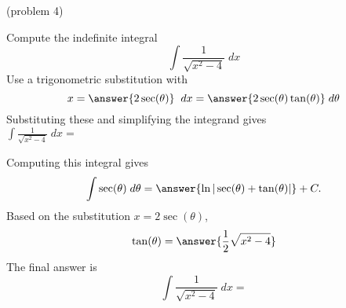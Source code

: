 \documentclass[handout]{ximera}
\begin{document}
\begin{problem}(problem 4)

Compute the indefinite integral 
\[
\int   \frac{1}{\sqrt{x^2 - 4}} \; dx
\]
Use a trigonometric substitution with\\
\[
x = \answer{2\sec(\theta)} \;\; dx = \answer{2\sec(\theta)\tan(\theta)} \; d\theta
\]
Substituting these and simplifying the integrand gives\\
$\displaystyle{\int   \frac{1}{\sqrt{x^2 - 4}}\; dx =}$\\
\begin{multipleChoice}
\end{multipleChoice}

Computing this integral gives
\[
\int \sec(\theta) \; d\theta = \answer{\ln|\sec(\theta) + \tan(\theta)|} + C.
\]
Based on the substitution $x = 2\sec(\theta)$, \\
\[
\tan(\theta) = \answer{\frac12\sqrt{x^2-4}}
\]
The final answer is
\[
\int   \frac{1}{\sqrt{x^2 - 4}}\; dx = 
\]
\begin{center}
\begin{multipleChoice}
\end{multipleChoice}
\end{center}


\end{problem}
\end{document}
